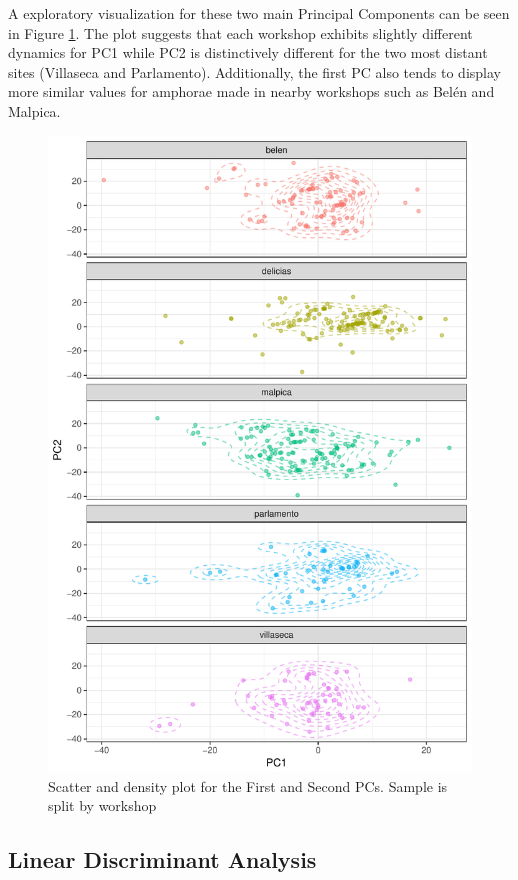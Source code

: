 \documentclass[review]{elsarticle}
\begin{document}
A exploratory visualization for these two main Principal Components can be seen in Figure \ref{pca}. The plot suggests that each workshop exhibits slightly different dynamics for PC1 while PC2 is distinctively different for the two most distant sites (Villaseca and Parlamento). Additionally, the first PC also tends to display more similar values for amphorae made in nearby workshops such as Bel\'en and Malpica. 

\begin{figure}[htp]
	\centering
\includegraphics[width=\linewidth]{figs/pca}
\caption{Scatter and density plot for the First and Second PCs. Sample is split by workshop}
\label{pca}
\end{figure} 

\subsection{Linear Discriminant Analysis}
\end{document}
